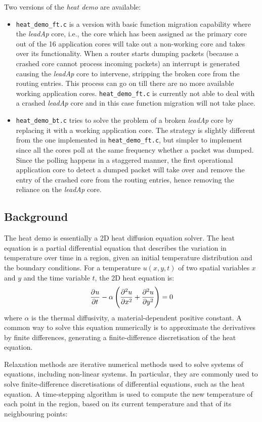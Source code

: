 \documentclass[a4paper, 11pt]{article}
\begin{document}
Two versions of the \emph{heat demo} are available:
\begin{itemize}
\item \verb|heat_demo_ft.c| is a version with basic function migration capability where the \emph{leadAp} core, i.e., the core which has been assigned as the primary core out of the 16 application cores will take out a non-working core and takes over its functionality. When a router starts dumping packets (because a crashed core cannot process incoming packets) an interrupt is generated causing the \emph{leadAp} core to intervene, stripping the broken core from the routing entries. This process can go on till there are no more available working application cores. \verb|heat_demo_ft.c| is currently not able to deal with a crashed \emph{leadAp} core and in this case function migration will not take place.

\item \verb|heat_demo_bt.c| tries to solve the problem of a broken \emph{leadAp} core by replacing it with a working application core. The strategy is slightly different from the one implemented in \verb|heat_demo_ft.c|, but simpler to implement since all the cores poll at the same frequency whether a packet was dumped. Since the polling happens in a staggered manner, the first operational application core to detect a dumped packet will take over and remove the entry of the crashed core from the routing entries, hence removing the reliance on the \emph{leadAp} core.
\end{itemize}

\subsection{Background}
The heat demo is essentially a 2D heat diffusion equation solver. The heat equation is a partial differential equation that describes the variation in temperature over time in a region, given an initial temperature distribution and the boundary conditions. For a temperature $u(x,y,t)$ of two spatial variables $x$ and $y$ and the time variable $t$, the 2D heat equation is:
\[
\dpd{u}{t} -\alpha\left( \dpd[2]{u}{x} + \dpd[2]{u}{y} \right) = 0 
\]
where $\alpha$ is the thermal diffusivity, a material-dependent positive constant. A common way to solve this equation numerically is to approximate the derivatives by finite differences, generating a finite-difference discretisation of the heat equation.

Relaxation methods are iterative numerical methods used to solve systems of equations, including non-linear systems. In particular, they are commonly used to solve finite-difference discretisations of differential equations, such as the heat equation. A time-stepping algorithm is used to compute the new temperature of each point in the region, based on its current temperature and that of its neighbouring points:
\end{document}
